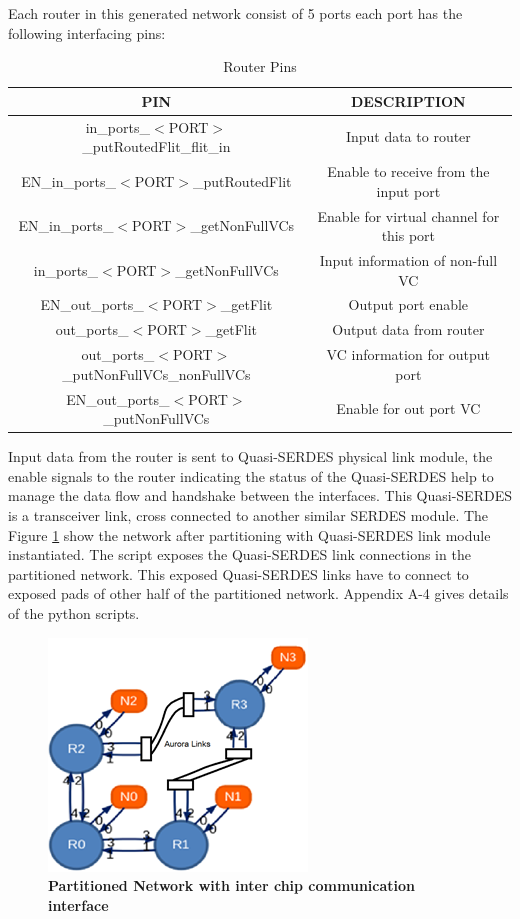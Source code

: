 Each router in this generated network consist of 5 ports each port has the following interfacing pins:
\begin{table} [H]
\caption{Router Pins}
\begin{center}
 \begin{tabular}{||c | c||} 
 \hline
    \textbf{PIN} & \textbf{DESCRIPTION} \\ \hline
	in\_ports\_$<$PORT$>$\_putRoutedFlit\_flit\_in & Input data to router\\
	EN\_in\_ports\_$<$PORT$>$\_putRoutedFlit & Enable to receive from the input port\\
	EN\_in\_ports\_$<$PORT$>$\_getNonFullVCs & Enable for virtual channel for this port\\
	in\_ports\_$<$PORT$>$\_getNonFullVCs & Input information of non-full VC \\
	EN\_out\_ports\_$<$PORT$>$\_getFlit & Output port enable\\
	out\_ports\_$<$PORT$>$\_getFlit & Output data from router\\
	out\_ports\_$<$PORT$>$\_putNonFullVCs\_nonFullVCs & VC information for output port\\
	EN\_out\_ports\_$<$PORT$>$\_putNonFullVCs & Enable for out port VC\\
 \hline
\end{tabular}
\end{center}
\label{RouterPins}
\end{table}

Input data from the router is sent to Quasi-SERDES physical link module, the enable signals to the router indicating the status of the Quasi-SERDES help to manage the data flow and handshake between the interfaces. This Quasi-SERDES is a transceiver link, cross connected to another similar SERDES module. The Figure \ref{PartionedNoC} show the network after partitioning with Quasi-SERDES link module instantiated. The script exposes the Quasi-SERDES link connections in the partitioned network. This exposed Quasi-SERDES links have to connect to exposed pads of other half of the partitioned network. Appendix A-4 gives details of the python scripts.


\begin{centering}
\begin{figure}[H]
  \centering
   \includegraphics[scale=1]{./figs/PartitionedNoC2x2}
  \caption{\textbf{Partitioned Network with inter chip communication interface}}
  \label{PartionedNoC}
\end{figure}
\end{centering}

